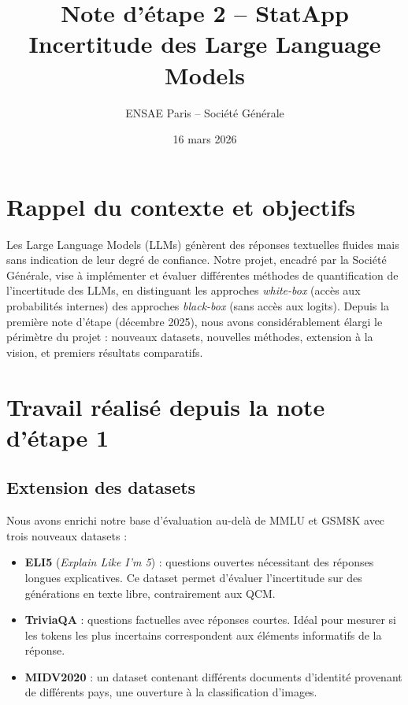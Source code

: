 \documentclass[a4paper, 11pt]{article}
\title{\textbf{Note d'étape 2 -- StatApp}\\
\large Incertitude des Large Language Models}
\author{ENSAE Paris -- Société Générale}
\date{16 mars 2026}
\begin{document}
\maketitle
\section{Rappel du contexte et objectifs}
Les Large Language Models (LLMs) génèrent des réponses textuelles fluides mais sans indication de leur degré de confiance. Notre projet, encadré par la Société Générale, vise à implémenter et évaluer différentes méthodes de quantification de l'incertitude des LLMs, en distinguant les approches \emph{white-box} (accès aux probabilités internes) des approches \emph{black-box} (sans accès aux logits). Depuis la première note d'étape (décembre 2025), nous avons considérablement élargi le périmètre du projet : nouveaux datasets, nouvelles méthodes, extension à la vision, et premiers résultats comparatifs.
\section{Travail réalisé depuis la note d'étape 1}
\subsection{Extension des datasets}
Nous avons enrichi notre base d'évaluation au-delà de MMLU et GSM8K avec trois nouveaux datasets :
\begin{itemize}[nosep]
    \item \textbf{ELI5} (\emph{Explain Like I'm 5}) : questions ouvertes nécessitant des réponses longues explicatives. Ce dataset permet d'évaluer l'incertitude sur des générations en texte libre, contrairement aux QCM.
    \item \textbf{TriviaQA} : questions factuelles avec réponses courtes. Idéal pour mesurer si les tokens les plus incertains correspondent aux éléments informatifs de la réponse.
    \item \textbf{MIDV2020} : un dataset contenant différents documents d'identité provenant de différents pays, une ouverture à la classification d'images.
\end{itemize}
\end{document}
